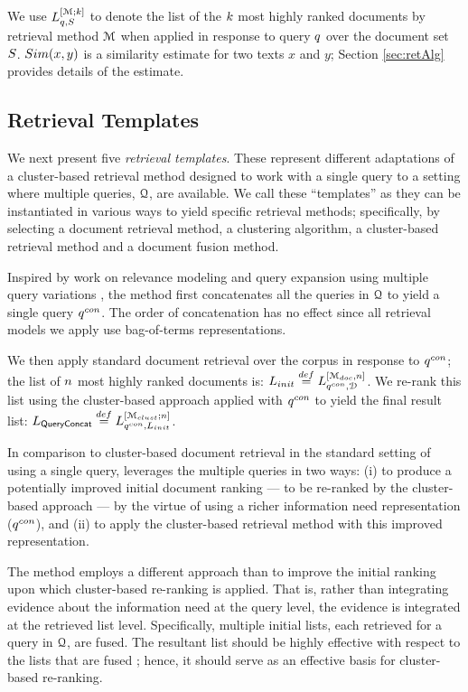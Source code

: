 We use $L_{q,S}^{[{\mathcal M};k]}$ to denote
the list of the $k$ most highly ranked documents by retrieval
method ${\mathcal M}$ when applied in response to query $q$ over
the document set $S$. $Sim(x,y)$ is a
similarity estimate for two texts $x$ and $y$; Section 
\ref{sec:retAlg} provides details of the estimate.


\subsection{Retrieval Templates}
We next present five {\em retrieval templates}. These represent
different adaptations of a cluster-based retrieval method designed to
work with a single query to a setting where multiple queries, ${\mathcal Q}$, are available. We call these ``templates'' as they can be instantiated in various ways to yield specific retrieval methods; specifically, by selecting a document retrieval method, a clustering algorithm, a cluster-based retrieval method and a document fusion method.


\myparagraph{\queryCatNoR} Inspired by work on relevance modeling and
query expansion using multiple query variations \cite{Lu+al:19a}, the \firstmention{\queryCat} method first concatenates all the queries in
${\mathcal Q}$ to yield a single query $q^{con}$. The order of concatenation has no effect since all retrieval models we apply use bag-of-terms representations.

We then apply standard document retrieval over the corpus in response
to $q^{con}$; the list of $n$ most highly ranked documents is:
$L_{init} \stackrel{def}{=} L_{q^{con},{\mathcal D}}^{[{\mathcal M_{doc}},n]}$. We 
re-rank this list using the cluster-based approach applied with $q^{con}$ to yield the final
result list: $L_{{\sf\small{QueryConcat}}} \stackrel{def}{=} L_{q^{con},L_{init}}^{[\mathcal M_{clust};n]}$.

In comparison to cluster-based document retrieval in the standard
setting of using a single query, \queryCat leverages the
multiple queries in two ways: (i) to produce a potentially improved initial
document ranking --- to be re-ranked by the cluster-based approach --- by the virtue of using a richer information need representation ($q^{con}$), and (ii) to apply the cluster-based retrieval method with this improved representation. 

\myparagraph{\fuseClustNoR} The \firstmention{\fuseClust} method employs
a different approach than \queryCat to improve the initial ranking upon which cluster-based re-ranking is applied. That is, rather than integrating evidence
about the information need at the query level, the evidence is integrated at the retrieved list level. Specifically, multiple initial lists,
each retrieved for a query in ${\mathcal Q}$, are fused. The resultant list should be highly effective with respect to the lists that are fused \cite{Belkin+al:95a,bailey2016uqv100,bailey2017retrieval,bc17-adcs};  hence, it should serve as an effective basis for cluster-based re-ranking.


